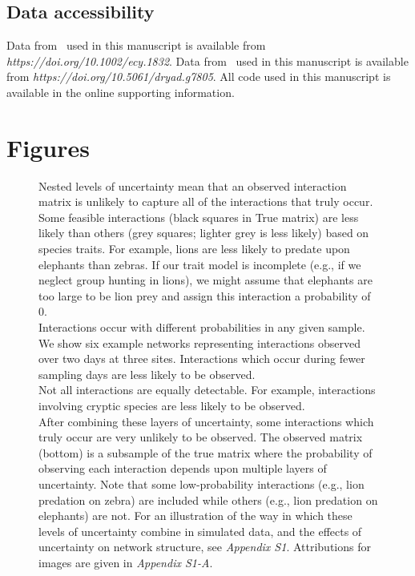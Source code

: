 \documentclass[12pt]{article}
\begin{document}
\begin{spacing}{2.0}
\section*{Data accessibility}

Data from~\citet{Kopelke2017} used in this manuscript is available from \emph{https://doi.org/10.1002/ecy.1832}. Data from~\citet{Barbour2016} used in this manuscript is available from \emph{https://doi.org/10.5061/dryad.g7805}. All code used in this manuscript is available in the online supporting information. 



\end{spacing}
\clearpage


\section*{Figures}

  \begin{figure}[h!]
    \caption{Nested levels of uncertainty mean that an observed interaction matrix is unlikely to capture all of the interactions that truly occur. Some feasible interactions (black squares in True matrix) are less likely than others (grey squares; lighter grey is less likely) based on species traits. For example, lions are less likely to predate upon elephants than zebras. If our trait model is incomplete (e.g., if we neglect group hunting in lions), we might assume that elephants are too large to be lion prey and assign this interaction a probability of 0.\\
    \indent Interactions occur with different probabilities in any given sample. We show six example networks representing interactions observed over two days at three sites. Interactions which occur during fewer sampling days are less likely to be observed.\\
    \indent Not all interactions are equally detectable. For example, interactions involving cryptic species are less likely to be observed.\\
    \indent After combining these layers of uncertainty, some interactions which truly occur are very unlikely to be observed. The observed matrix (bottom) is a subsample of the true matrix where the probability of observing each interaction depends upon multiple layers of uncertainty. Note that some low-probability interactions (e.g., lion predation on zebra) are included while others (e.g., lion predation on elephants) are not. For an illustration of the way in which these levels of uncertainty combine in simulated data, and the effects of uncertainty on network structure, see \emph{Appendix S1}. Attributions for images are given in \emph{Appendix S1-A}.}
    \label{conceptual_fig}
    \begin{center}
    \end{center}
    \end{figure}
\end{document}
